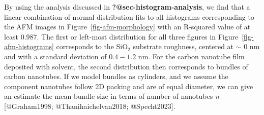 \documentclass[
  letterpaper,
  DIV=11,
  numbers=noendperiod]{scrartcl}
\newenvironment{Shaded}{\begin{snugshade}}{\end{snugshade}}
\newcommand{\AttributeTok}[1]{\textcolor[rgb]{0.40,0.45,0.13}{#1}}
\newcommand{\CommentTok}[1]{\textcolor[rgb]{0.37,0.37,0.37}{#1}}
\newcommand{\ConstantTok}[1]{\textcolor[rgb]{0.56,0.35,0.01}{#1}}
\newcommand{\DecValTok}[1]{\textcolor[rgb]{0.68,0.00,0.00}{#1}}
\newcommand{\FunctionTok}[1]{\textcolor[rgb]{0.28,0.35,0.67}{#1}}
\newcommand{\NormalTok}[1]{\textcolor[rgb]{0.00,0.23,0.31}{#1}}
\newcommand{\OtherTok}[1]{\textcolor[rgb]{0.00,0.23,0.31}{#1}}
\newcommand{\SpecialCharTok}[1]{\textcolor[rgb]{0.37,0.37,0.37}{#1}}
\newcommand{\StringTok}[1]{\textcolor[rgb]{0.13,0.47,0.30}{#1}}
\begin{document}
By using the analysis discussed in \textbf{?@sec-histogram-analysis}, we
find that a linear combination of normal distribution fits to all
histograms corresponding to the AFM images in
Figure~\ref{fig-afm-morphology} with an R-squared value of at least
0.987. The first or left-most distribution for all three figures in
Figure~\ref{fig-afm-histograms} corresponds to the SiO\(_2\) substrate
roughness, centered at \(\sim\) 0 nm and with a standard deviation of
\(0.4-1.2\) nm. For the carbon nanotube film deposited with solvent, the
second distribution then corresponds to bundles of carbon nanotubes. If
we model bundles as cylinders, and we assume the component nanotubes
follow 2D packing and are of equal diameter, we can give an estimate the
mean bundle size in terms of number of nanotubes \emph{n}
{[}@Graham1998; @Thanihaichelvan2018; @Specht2023{]}.

\begin{Shaded}
\end{Shaded}
\end{document}
